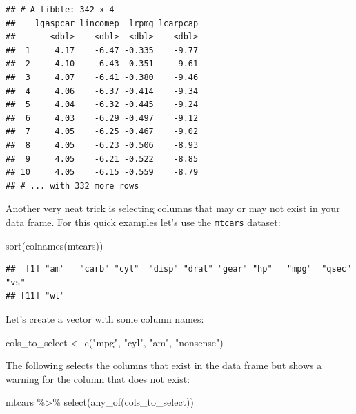\documentclass[
]{article}
\newenvironment{Shaded}{\begin{snugshade}}{\end{snugshade}}
\newcommand{\FunctionTok}[1]{\textcolor[rgb]{0.00,0.00,0.00}{#1}}
\newcommand{\NormalTok}[1]{#1}
\newcommand{\OtherTok}[1]{\textcolor[rgb]{0.56,0.35,0.01}{#1}}
\newcommand{\SpecialCharTok}[1]{\textcolor[rgb]{0.00,0.00,0.00}{#1}}
\newcommand{\StringTok}[1]{\textcolor[rgb]{0.31,0.60,0.02}{#1}}
\begin{document}
\begin{verbatim}
## # A tibble: 342 x 4
##    lgaspcar lincomep  lrpmg lcarpcap
##       <dbl>    <dbl>  <dbl>    <dbl>
##  1     4.17    -6.47 -0.335    -9.77
##  2     4.10    -6.43 -0.351    -9.61
##  3     4.07    -6.41 -0.380    -9.46
##  4     4.06    -6.37 -0.414    -9.34
##  5     4.04    -6.32 -0.445    -9.24
##  6     4.03    -6.29 -0.497    -9.12
##  7     4.05    -6.25 -0.467    -9.02
##  8     4.05    -6.23 -0.506    -8.93
##  9     4.05    -6.21 -0.522    -8.85
## 10     4.05    -6.15 -0.559    -8.79
## # ... with 332 more rows
\end{verbatim}

Another very neat trick is selecting columns that may or may not exist in your data frame. For this quick examples
let's use the \texttt{mtcars} dataset:

\begin{Shaded}
\begin{Highlighting}[]
\FunctionTok{sort}\NormalTok{(}\FunctionTok{colnames}\NormalTok{(mtcars))}
\end{Highlighting}
\end{Shaded}

\begin{verbatim}
##  [1] "am"   "carb" "cyl"  "disp" "drat" "gear" "hp"   "mpg"  "qsec" "vs"  
## [11] "wt"
\end{verbatim}

Let's create a vector with some column names:

\begin{Shaded}
\begin{Highlighting}[]
\NormalTok{cols\_to\_select }\OtherTok{\textless{}{-}} \FunctionTok{c}\NormalTok{(}\StringTok{"mpg"}\NormalTok{, }\StringTok{"cyl"}\NormalTok{, }\StringTok{"am"}\NormalTok{, }\StringTok{"nonsense"}\NormalTok{)}
\end{Highlighting}
\end{Shaded}

The following selects the columns that exist
in the data frame but shows a warning for the column that does not exist:

\begin{Shaded}
\begin{Highlighting}[]
\NormalTok{mtcars }\SpecialCharTok{\%\textgreater{}\%}
  \FunctionTok{select}\NormalTok{(}\FunctionTok{any\_of}\NormalTok{(cols\_to\_select))}
\end{Highlighting}
\end{Shaded}
\end{document}
